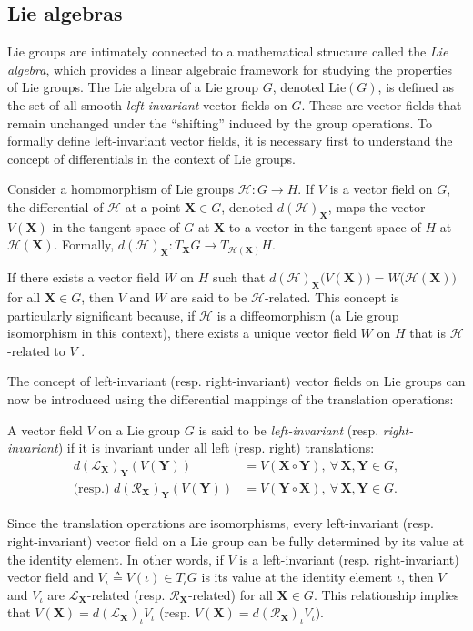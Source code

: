 \subsection{Lie algebras}
Lie groups are intimately connected to a mathematical structure called the \emph{Lie algebra}, which provides a linear algebraic framework for studying the properties of Lie groups. The Lie algebra of a Lie group $G$, denoted $\text{Lie}(G)$, is defined as the set of all smooth \emph{left-invariant} vector fields on $G$. These are vector fields that remain unchanged under the ``shifting'' induced by the group operations. To formally define left-invariant vector fields, it is necessary first to understand the concept of differentials in the context of Lie groups.

Consider a homomorphism of Lie groups $\mathcal{H}:G\to H$. If $V$ is a vector field on $G$, the differential of $\mathcal{H}$ at a point $\mathbf{X}\in G$, denoted $d(\mathcal{H})_\mathbf{X}$, maps the vector $V(\mathbf{X})$ in the tangent space of $G$ at $\mathbf{X}$ to a vector in the tangent space of $H$ at $\mathcal{H}(\mathbf{X})$. Formally, $d(\mathcal{H})_\mathbf{X}:T_\mathbf{X}G\to T_{\mathcal{H}(\mathbf{X})}H$.

If there exists a vector field $W$ on $H$ such that $d(\mathcal{H})_\mathbf{X}\bigl(V(\mathbf{X})\bigr) = W\bigl(\mathcal{H}(\mathbf{X})\bigr)$ for all $\mathbf{X}\in G$, then $V$ and $W$ are said to be $\mathcal{H}$-related. This concept is particularly significant because, if $\mathcal{H}$ is a diffeomorphism (a Lie group isomorphism in this context), there exists a unique vector field $W$ on $H$ that is $\mathcal{H}$-related to $V$ \citep[p. 183]{Lee2012}.

The concept of left-invariant (resp. right-invariant) vector fields on Lie groups can now be introduced using the differential mappings of the translation operations:
\begin{definition}\label{def:left-right-invariant-vector-field}
    A vector field $V$ on a Lie group $G$ is said to be \emph{left-invariant} (resp. \emph{right-invariant}) if it is invariant under all left (resp. right) translations:
    \begin{align*}
        d(\mathcal{L}_\mathbf{X})_\mathbf{Y}(V(\mathbf{Y})) &= V(\mathbf{X}\circ\mathbf{Y}), \ \forall\,\mathbf{X},\mathbf{Y}\in G,\\
        \text{(resp.) }d(\mathcal{R}_\mathbf{X})_\mathbf{Y}(V(\mathbf{Y})) &= V(\mathbf{Y}\circ\mathbf{X}), \ \forall\,\mathbf{X},\mathbf{Y}\in G.
    \end{align*}  
\end{definition}
Since the translation operations are isomorphisms, every left-invariant (resp. right-invariant) vector field on a Lie group can be fully determined by its value at the identity element. In other words, if $V$ is a left-invariant (resp. right-invariant) vector field and $V_\iota\triangleq V(\iota) \in T_\iota G$ is its value at the identity element $\iota$, then $V$ and $V_\iota$ are $\mathcal{L}_\mathbf{X}$-related (resp. $\mathcal{R}_\mathbf{X}$-related) for all $\mathbf{X}\in G$. This relationship implies that $V(\mathbf{X}) = d(\mathcal{L}_\mathbf{X})_\iota V_\iota$ (resp. $V(\mathbf{X}) = d(\mathcal{R}_\mathbf{X})_\iota V_\iota$).

